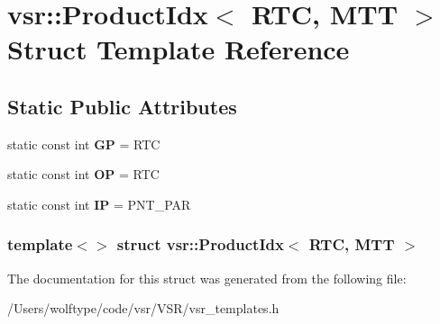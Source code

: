 \hypertarget{structvsr_1_1_product_idx_3_01_r_t_c_00_01_m_t_t_01_4}{\section{vsr\-:\-:Product\-Idx$<$ R\-T\-C, M\-T\-T $>$ Struct Template Reference}
\label{structvsr_1_1_product_idx_3_01_r_t_c_00_01_m_t_t_01_4}
}
\subsection*{Static Public Attributes}
\begin{DoxyCompactItemize}
\item 
\hypertarget{structvsr_1_1_product_idx_3_01_r_t_c_00_01_m_t_t_01_4_aea970ab7f06b2fdb3318283c497002c6}{static const int {\bfseries G\-P} = R\-T\-C}\label{structvsr_1_1_product_idx_3_01_r_t_c_00_01_m_t_t_01_4_aea970ab7f06b2fdb3318283c497002c6}

\item 
\hypertarget{structvsr_1_1_product_idx_3_01_r_t_c_00_01_m_t_t_01_4_a6c4d6600dcda060a05e3dc0880500105}{static const int {\bfseries O\-P} = R\-T\-C}\label{structvsr_1_1_product_idx_3_01_r_t_c_00_01_m_t_t_01_4_a6c4d6600dcda060a05e3dc0880500105}

\item 
\hypertarget{structvsr_1_1_product_idx_3_01_r_t_c_00_01_m_t_t_01_4_acd8f7eabd62cb707b34e58fb8245bb17}{static const int {\bfseries I\-P} = P\-N\-T\-\_\-\-P\-A\-R}\label{structvsr_1_1_product_idx_3_01_r_t_c_00_01_m_t_t_01_4_acd8f7eabd62cb707b34e58fb8245bb17}

\end{DoxyCompactItemize}
\subsubsection*{template$<$$>$ struct vsr\-::\-Product\-Idx$<$ R\-T\-C, M\-T\-T $>$}



The documentation for this struct was generated from the following file\-:\begin{DoxyCompactItemize}
\item 
/\-Users/wolftype/code/vsr/\-V\-S\-R/vsr\-\_\-templates.\-h\end{DoxyCompactItemize}
